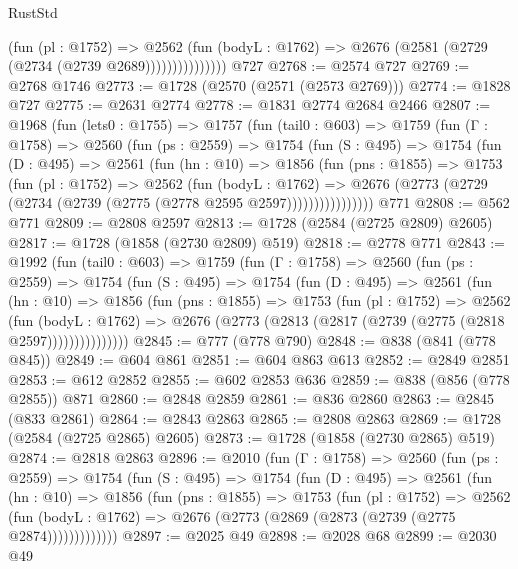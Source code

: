 \begin{lexlean}{RustStd}
\begin{coremodule}
{\begin{coremodule}
{{{{{{{{{{{{{                      (fun (pl : @1752) =>
                      @2562
                        (fun (bodyL : @1762) =>
                        @2676 (@2581 (@2729 (@2734 (@2739 @2689)))))))))))))))
    @727
@2768 := @2574 @727
@2769 := @2768 @1746
@2773 := @1728 (@2570 (@2571 (@2573 @2769)))
@2774 := @1828 @727
@2775 := @2631 @2774
@2778 := @1831 @2774 @2684 @2466
@2807 := @1968
    (fun (lets0 : @1755) =>
    @1757
      (fun (tail0 : @603) =>
      @1759
        (fun (Γ : @1758) =>
        @2560
          (fun (ps : @2559) =>
          @1754
            (fun (S : @495) =>
            @1754
              (fun (D : @495) =>
              @2561
                (fun (hn : @10) =>
                @1856
                  (fun (pns : @1855) =>
                  @1753
                    (fun (pl : @1752) =>
                    @2562
                      (fun (bodyL : @1762) =>
                      @2676 (@2773 (@2729 (@2734 (@2739 (@2775 (@2778 @2595 @2597))))))))))))))))
    @771
@2808 := @562 @771
@2809 := @2808 @2597
@2813 := @1728 (@2584 (@2725 @2809) @2605)
@2817 := @1728 (@1858 (@2730 @2809) @519)
@2818 := @2778 @771
@2843 := @1992
    (fun (tail0 : @603) =>
    @1759
      (fun (Γ : @1758) =>
      @2560
        (fun (ps : @2559) =>
        @1754
          (fun (S : @495) =>
          @1754
            (fun (D : @495) =>
            @2561
              (fun (hn : @10) =>
              @1856
                (fun (pns : @1855) =>
                @1753
                  (fun (pl : @1752) =>
                  @2562
                    (fun (bodyL : @1762) =>
                    @2676 (@2773 (@2813 (@2817 (@2739 (@2775 (@2818 @2597)))))))))))))))
@2845 := @777 (@778 @790)
@2848 := @838 (@841 (@778 @845))
@2849 := @604 @861
@2851 := @604 @863 @613
@2852 := @2849 @2851
@2853 := @612 @2852
@2855 := @602 @2853 @636
@2859 := @838 (@856 (@778 @2855)) @871
@2860 := @2848 @2859
@2861 := @836 @2860
@2863 := @2845 (@833 @2861)
@2864 := @2843 @2863
@2865 := @2808 @2863
@2869 := @1728 (@2584 (@2725 @2865) @2605)
@2873 := @1728 (@1858 (@2730 @2865) @519)
@2874 := @2818 @2863
@2896 := @2010
    (fun (Γ : @1758) =>
    @2560
      (fun (ps : @2559) =>
      @1754
        (fun (S : @495) =>
        @1754
          (fun (D : @495) =>
          @2561
            (fun (hn : @10) =>
            @1856
              (fun (pns : @1855) =>
              @1753
                (fun (pl : @1752) =>
                @2562
                  (fun (bodyL : @1762) =>
                  @2676 (@2773 (@2869 (@2873 (@2739 (@2775 @2874)))))))))))))
@2897 := @2025 @49
@2898 := @2028 @68
@2899 := @2030 @49
}}}}}}}}}}}}}
\end{coremodule}}
\end{coremodule}
\end{lexlean}
